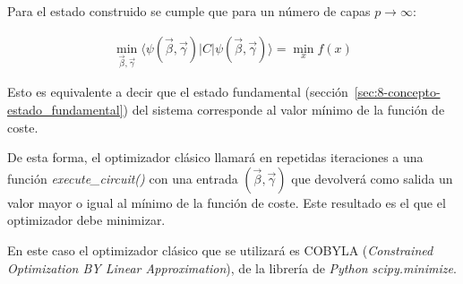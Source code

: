 Para el estado construido se cumple que para un número de capas $p \rightarrow \infty$:

\begin{align}
  \min_{\vec{\beta}, \vec{\gamma}} \langle \psi(\vec{\beta}, \vec{\gamma}) \rvert C \lvert \psi(\vec{\beta}, \vec{\gamma}) \rangle = \min_{x} f(x)
\end{align}

Esto es equivalente a decir que el estado fundamental (sección~\ref{sec:8-concepto-estado_fundamental}) del sistema corresponde al valor mínimo de la función de coste.

De esta forma, el optimizador clásico llamará en repetidas iteraciones a una función \textit{execute\_circuit()} con una entrada $(\vec{\beta}, \vec{\gamma})$ que devolverá como salida un valor mayor o igual al mínimo de la función de coste.
Este resultado es el que el optimizador debe minimizar.

En este caso el optimizador clásico que se utilizará es COBYLA (\textit{Constrained Optimization BY Linear Approximation}), de la librería de \textit{Python} \textit{scipy.minimize}.


